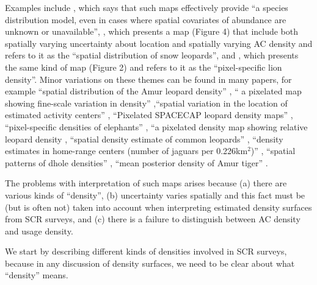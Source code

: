 \documentclass[10pt,a4paper]{article}
\begin{document}
Examples include \cite{Dorazio+Karanth:17}, which says that such maps effectively provide  ``a species distribution model, even in cases where spatial covariates of abundance are unknown or unavailable'', \cite{Alexander+al:15}, which presents a map (Figure 4) that include both spatially varying uncertainty about location and spatially varying AC density and refers to it as the ``spatial distribution of snow leopards'', and \cite{Elliot+Gopalaswamy:16}, which presents the same kind of map (Figure 2) and refers to it as the ``pixel-specific lion density''. Minor variations on these themes can be found in many papers, for example ``spatial distribution of the Amur leopard density'' \citep{Qi2015}, `` a pixelated map showing fine-scale variation in density'' \citep{Fouche2020},``spatial variation in the location of estimated activity centers'' \citep{Blanc2013}, ``Pixelated SPACECAP leopard density maps'' \citep{Devens2021}, ``pixel-specific densities of elephants'' \citep{Goswami2019}, ``a pixelated density map showing relative leopard density \citep{Kandel2020}, ``spatial density estimate of common leopards'' \citep{Goldberg2015}, ``density estimates in home-range centers (number of jaguars per 0.226km$^2$)'' \citep{Lavariega2020}, ``spatial patterns of dhole densities'' \citep{Srivathsa2021}, ``mean posterior density of Amur tiger'' \citep{Xiao2016}.

The problems with interpretation of such maps arises because (a) there are various kinds of ``density'', (b) uncertainty varies spatially and this fact must be (but is often not) taken into account when interpreting estimated density surfaces from SCR surveys, and (c) there is a failure to distinguish between AC density and usage density. 

We start by describing different kinds of densities involved in SCR surveys, because in any discussion of density surfaces, we need to be clear about what ``density'' means. %

\end{document}
